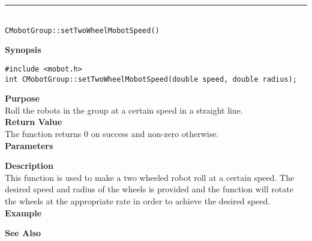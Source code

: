 \noindent
\vspace{5pt}
\rule{4.5in}{0.015in}\\
\noindent
{\LARGE \texttt{CMobotGroup::setTwoWheelMobotSpeed()}}\\
{}

\noindent
{\bf Synopsis}
\vspace{-8pt}
\begin{verbatim}
#include <mobot.h>
int CMobotGroup::setTwoWheelMobotSpeed(double speed, double radius);
\end{verbatim}

\noindent
{\bf Purpose}\\
Roll the robots in the group at a certain speed in a straight line.\\

\noindent
{\bf Return Value}\\
The function returns 0 on success and non-zero otherwise.\\

\noindent
{\bf Parameters}
\vspace{-0.1in}

\noindent
{\bf Description}\\
This function is used to make a two wheeled robot roll at a certain speed. The desired 
speed and radius of the wheels is provided and the function will rotate the wheels at the
appropriate rate in order to achieve the desired speed.
\noindent\\
{\bf Example}\\
\noindent

\noindent
{\bf See Also}\\

